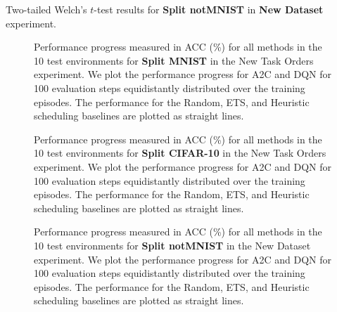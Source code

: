 \begin{table}[t]
	\centering
	\caption{Two-tailed Welch's $t$-test results for \textbf{Split notMNIST} in \textbf{New Dataset} experiment. 
	}
	\vspace{-3mm}
	\resizebox{0.99\textwidth}{!}{
		
	}
	\label{tab:t_test_new_dataset_notmnist}
\end{table}



\clearpage
\begin{figure}[t]
  \centering
  \setlength{\figwidth}{0.26\textwidth}
  \setlength{\figheight}{.14\textheight}
  
  \vspace{-3mm}
  \caption{Performance progress measured in ACC (\%) for all methods in the 10 test environments for {\bf Split MNIST} in the New Task Orders experiment. We plot the performance progress for A2C and DQN for 100 evaluation steps equidistantly distributed over the training episodes. The performance for the Random, ETS, and Heuristic scheduling baselines are plotted as straight lines.  }
  \label{fig:policy_rewards_mnist_paperD}
  \vspace{-3mm}
\end{figure}


\begin{figure}[t]
  \centering
  \setlength{\figwidth}{0.26\textwidth}
  \setlength{\figheight}{.14\textheight}
  
  \vspace{-3mm}
  \caption{Performance progress measured in ACC (\%) for all methods in the 10 test environments for {\bf Split CIFAR-10} in the New Task Orders experiment. We plot the performance progress for A2C and DQN for 100 evaluation steps equidistantly distributed over the training episodes. The performance for the Random, ETS, and Heuristic scheduling baselines are plotted as straight lines.  }
  \label{fig:policy_rewards_cifar10_paperD}
  \vspace{-3mm}
\end{figure}

\clearpage

\begin{figure}[t]
  \centering
  \setlength{\figwidth}{0.26\textwidth}
  \setlength{\figheight}{.14\textheight}
  
  \vspace{-3mm}
  \caption{Performance progress measured in ACC (\%) for all methods in the 10 test environments for {\bf Split notMNIST} in the New Dataset experiment. We plot the performance progress for A2C and DQN for 100 evaluation steps equidistantly distributed over the training episodes. The performance for the Random, ETS, and Heuristic scheduling baselines are plotted as straight lines.  }
  \label{fig:policy_rewards_notmnist_new_dataset_paperD}
  \vspace{-3mm}
\end{figure}

